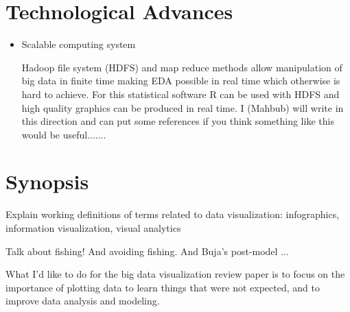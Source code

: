 \documentclass{article}
\begin{document}
\section{Technological Advances}

\begin{itemize}
	\item{Scalable computing system} 
	
	Hadoop file system (HDFS) and map reduce methods allow manipulation of big data in finite time making EDA possible in real time which otherwise is hard to achieve. For this statistical software R can be used with HDFS and high quality graphics can be produced in real time. I (Mahbub) will write in this direction and can put some references if you think something like this would be useful.......
	
\end{itemize}

\section{Synopsis}

Explain working definitions of terms related to data visualization: infographics, information visualization, visual analytics

Talk about fishing! And avoiding fishing. And Buja's post-model ...

What I'd like to do for the big data visualization review paper is to focus on the importance of plotting data to learn things that were not expected, and to improve data analysis and modeling.
\end{document}
